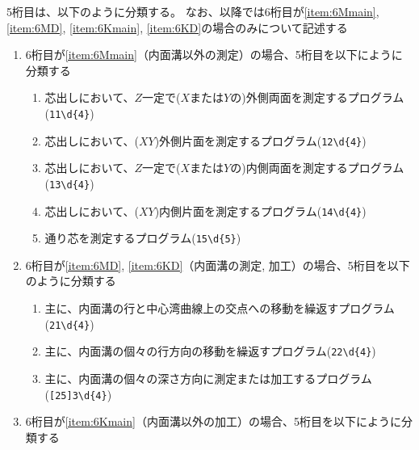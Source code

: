 \clearpage
5桁目は、以下のように分類する。
なお、以降では6桁目が\ref{item:6Mmain}, \ref{item:6MD}, \ref{item:6Kmain}, \ref{item:6KD}の場合のみについて記述する
\begin{enumerate}[label=\alph*)]
\item 6桁目が\ref{item:6Mmain}（内面溝以外の測定）の場合、5桁目を以下にように分類する
  \begin{enumerate}[label=\arabic*., ref=\arabic*, start=1]
  \item\label{item:5MCOBsZ} 芯出しにおいて、$Z$一定で($X$または$Y$の)外側両面を測定するプログラム(\verb|11\d{4}|)
  \item\label{item:5MCOO} 芯出しにおいて、($XY$)外側片面を測定するプログラム(\verb|12\d{4}|)
  \item\label{item:5MCIB} 芯出しにおいて、$Z$一定で($X$または$Y$の)内側両面を測定するプログラム(\verb|13\d{4}|)
  \item\label{item:5MCIO} 芯出しにおいて、($XY$)内側片面を測定するプログラム(\verb|14\d{4}|)
  \item\label{item:5MCL} 通り芯を測定するプログラム(\verb|15\d{5}|)
  \end{enumerate}
\item 6桁目が\ref{item:6MD}, \ref{item:6KD}（内面溝の測定, 加工）の場合、5桁目を以下のように分類する
  \begin{enumerate}[label=\arabic*., ref=\arabic*]
  \item 主に、内面溝の行と中心湾曲線上の交点への移動を繰返すプログラム(\verb|21\d{4}|)
  \item 主に、内面溝の個々の行方向の移動を繰返すプログラム(\verb|22\d{4}|)
  \item 主に、内面溝の個々の深さ方向に測定または加工するプログラム(\verb|[25]3\d{4}|)
  \end{enumerate}
\item 6桁目が\ref{item:6Kmain}（内面溝以外の加工）の場合、5桁目を以下にように分類する
  \begin{enumerate}[label=\arabic*., ref=\arabic*, start=1]

\end{enumerate}
\end{enumerate}
